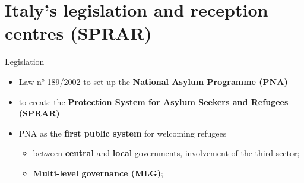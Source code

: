 \documentclass[xcolor={dvipsnames}]{beamer}
\begin{document}
\section{Italy's legislation and reception centres (SPRAR)}

\begin{frame}{Legislation}

\begin{itemize}
\justifying
\item Law n° 189/2002 to set up the \textbf{National Asylum Programme (PNA)} \citep{cittalia2022} \\

\vspace{5}

\item to create the \textbf{Protection System for Asylum Seekers and Refugees (SPRAR)} \\

\vspace{5}

\item PNA as the \textbf{first public system} for welcoming refugees \\ 

\vspace{5}
    
\begin{itemize}

\item {} between \textbf{central} and \textbf{local} governments, involvement of the third sector;
\item \textbf{Multi-level governance (MLG)};

\end{itemize}
\end{itemize}
\end{frame}
\end{document}
